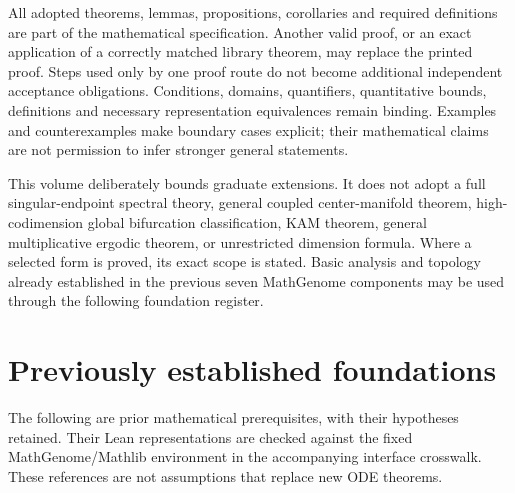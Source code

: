 \documentclass[11pt,oneside]{book}
\theoremstyle{definition}
\theoremstyle{remark}\newtheorem{remark}[theorem]{Remark}
\begin{document}
All adopted theorems, lemmas, propositions, corollaries and required definitions
are part of the mathematical specification. Another valid proof, or an exact
application of a correctly matched library theorem, may replace the printed
proof. Steps used only by one proof route do not become additional independent
acceptance obligations. Conditions, domains, quantifiers, quantitative bounds,
definitions and necessary representation equivalences remain binding.
Examples and counterexamples make boundary cases explicit; their mathematical
claims are not permission to infer stronger general statements.

This volume deliberately bounds graduate extensions. It does not adopt a full
singular-endpoint spectral theory, general coupled center-manifold theorem,
high-codimension global bifurcation classification, KAM theorem, general
multiplicative ergodic theorem, or unrestricted dimension formula. Where a
selected form is proved, its exact scope is stated. Basic analysis and topology
already established in the previous seven MathGenome components may be used
through the following foundation register.


\tableofcontents

\chapter*{Previously established foundations}
The following are prior mathematical prerequisites, with their hypotheses
retained. Their Lean representations are checked against the fixed
MathGenome/Mathlib environment in the accompanying interface crosswalk.
These references are not assumptions that replace new ODE theorems.
\end{document}

